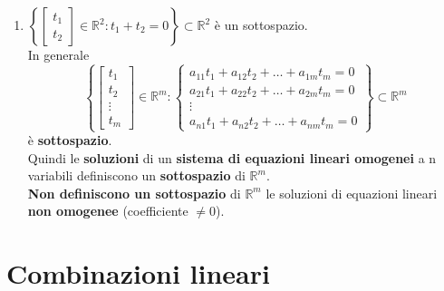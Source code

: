 \documentclass[a4paper, 12pt]{report}
\begin{document}
                    \begin{enumerate}
                        \item $ \left \{
                                \begin{bmatrix}
                                t_1\\
                                t_2
                                \end{bmatrix}
                                \in \mathbb{R}^2 : t_1+t_2=0
                                \right \}\subset \mathbb{R}^2
                                $ 
                                è un sottospazio.\\[2pt]
                                In generale
                                $$ \left \{
                                \begin{bmatrix}
                                t_1\\
                                t_2\\
                                \vdots\\
                                t_m
                                \end{bmatrix}
                                \in \mathbb{R}^m : 
                                \begin{cases}
                                    a_{11}t_1+a_{12}t_2+\dots+a_{1m}t_m=0\\
                                    a_{21}t_1+a_{22}t_2+\dots+a_{2m}t_m=0\\
                                    \vdots\\
                                    a_{n1}t_1+a_{n2}t_2+\dots+a_{nm}t_m=0
                                \end{cases}
                                \right \}\subset \mathbb{R}^m
                                $$
                                è \textbf{sottospazio}.\\
                                Quindi le \textbf{soluzioni} di un \textbf{sistema di equazioni lineari omogenei} a n
                                variabili definiscono un \textbf{sottospazio} di $\mathbb{R}^m$.\\
                                \textbf{Non definiscono un sottospazio} di $\mathbb{R}^m$ le soluzioni di equazioni lineari \textbf{non omogenee} (coefficiente $\neq 0$).
                    \end{enumerate}
            \clearpage
            \section{Combinazioni lineari}
\end{document}
